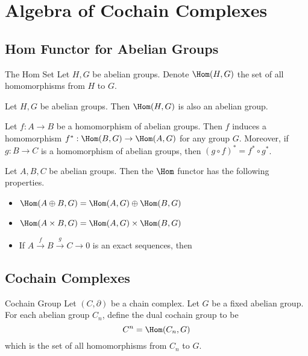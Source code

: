 \documentclass[a4paper]{article}
\begin{document}
\pagebreak
\section{Algebra of Cochain Complexes}
\subsection{Hom Functor for Abelian Groups}
\begin{defn}{The Hom Set}{} Let $H,G$ be abelian groups. Denote $\Hom(H,G)$ the set of all homomorphisms from $H$ to $G$. 
\end{defn}

\begin{lmm}{}{} Let $H,G$ be abelian groups. Then $\Hom(H,G)$ is also an abelian group. 
\end{lmm}

\begin{lmm}{}{} Let $f:A\to B$ be a homomorphism of abelian groups. Then $f$ induces a homomorphism $f^\ast:\Hom(B,G)\to\Hom(A,G)$ for any group $G$. Moreover, if $g:B\to C$ is a homomorphism of abelian groups, then $(g\circ f)^\ast=f^\ast\circ g^\ast$. 
\end{lmm}

\begin{prp}{}{} Let $A,B,C$ be abelian groups. Then the $\Hom$ functor has the following properties. 
\begin{itemize}
\item $\Hom(A\oplus B,G)=\Hom(A,G)\oplus\Hom(B,G)$
\item $\Hom(A\times B,G)=\Hom(A,G)\times\Hom(B,G)$
\item If $A\overset{f}{\to} B\overset{g}{\to} C\to 0$ is an exact sequences, then \\
\end{itemize}
\end{prp}

\subsection{Cochain Complexes}
\begin{defn}{Cochain Group}{} Let $(C,\partial)$ be a chain complex. Let $G$ be a fixed abelian group. For each abelian group $C_n$, define the dual cochain group to be $$C^n=\Hom(C_n,G)$$ which is the set of all homomorphisms from $C_n$ to $G$. 
\end{defn}
\end{document}
